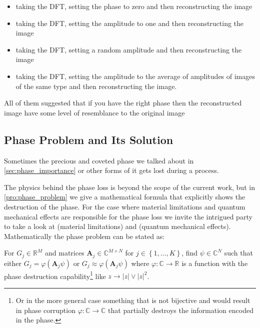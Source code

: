  \begin{itemize}
	\item taking the \ac{DFT}, setting the phase to zero and then reconstructing the image
  \item taking the \ac{DFT}, setting the amplitude to one and then reconstructing the image
	\item taking the \ac{DFT}, setting a random amplitude and then reconstructing the image
	\item taking the \ac{DFT}, setting the amplitude to the average of amplitudes of images of the same type and then reconstructing the image.
 \end{itemize} 
 All of them suggested that if you have the right phase then the reconstructed image have some level of resemblance to the original image \cite{Oppenheim1981}   

\subsection{Phase Problem and Its Solution}
Sometimes the precious and coveted phase we talked about in \cref{sec:phase_importance} or other forms of it gets lost during a process. 




The physics behind the phase loss is beyond the scope of the current work, but 
in \cref{pro:phase_problem} we give a mathematical formula that explicitly shows the destruction of the phase. 
For the case where material limitations and quantum mechanical effects are responsible for the phase loss we invite 
the intrigued party to take a look at \cite{Shechtman2015} (material limitations) and \cite{DGDS2018}\cite{FranzSchwabl2007} (quantum mechanical effects). 
Mathematically the phase problem can be stated as:
\begin{Pro}\label{pro:phase_problem} For $G_j \in \mathbb{R}^M$ and matrices 
  $\boldsymbol{A}_j \in \mathbb{C}^{M \times N}$ for $j \in \left\{1,\ldots,K\right\}$, find 
$\psi \in \mathbb{C}^N$ such that either $G_j = \varphi(\boldsymbol{A}_j\psi)$ or $G_j \approx \varphi(\boldsymbol{A}_j\psi)$ where 
$\varphi \colon \mathbb{C} \to \mathbb{R}$ is a function with the phase destruction 
capability\footnote{Or in the more general case something that is not bijective and would result in phase corruption $\varphi \colon \mathbb{C} \to \mathbb{C}$ 
that partially destroys the information encoded in the phase.} like $z \rightarrow \left|z\right| \lor {\left|z\right|^2}$. 
\end{Pro} 

